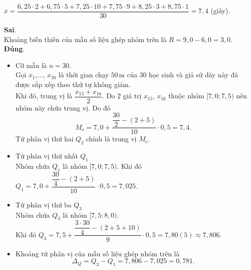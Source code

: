 \begin{ex}
{\begin{itemchoice}
			\begin{center}
				$\overline{x}=\dfrac{6{,}25 \cdot 2+6{,}75 \cdot 5+7{,}25 \cdot 10+7{,}75 \cdot 9+8{,}25 \cdot 3+8{,}75 \cdot 1}{30}=7{,}4$ (giây).
			\end{center}
			\itemch \textbf{Sai}.\\
			Khoảng biến thiên của mẫu số liệu ghép nhóm trên là $R=9{,}0-6{,}0=3{,}0$.
			\itemch \textbf{Đúng}.
			\begin{itemize}
				\item Cỡ mẫu là $n=30$.\\
				Gọi $x_{1}$,$\ldots$, $x_{30}$ là thời gian chạy $50$\,m của $30$ học sinh và giả sử dãy này đã được sắp xếp theo thứ tự không giảm.\\
				Khi đó, trung vị là $\dfrac{x_{15}+x_{16}}{2}$. Do $2$ giá trị $x_{15}$, $x_{16}$ thuộc nhóm $[7{,}0;7{,}5)$ nên nhóm này chứa trung vị. Do đó
				\[
				M_{\text{e}}=7{,}0+\dfrac{\dfrac{30}{2}-(2+5)}{10} \cdot 0{,}5=7{,}4.
				\]
				Tứ phân vị thứ hai $Q_{2}$ chính là trung vị $M_{\text{e}}$.
				\item Tứ phân vị thứ nhất $Q_{1}$\\
				Nhóm chứa $Q_{1}$ là nhóm $[7{,}0;7{,}5)$. Khi đó $Q_{1}=7{,}0+\dfrac{\dfrac{30}{4}-(2+5)}{10} \cdot 0{,}5=7{,}025$.
				\item Tứ phân vị thứ ba $Q_{3}$\\
				Nhóm chứa $Q_{3}$ là nhóm $[7{,}5;8{,}0)$.\\
				Khi đó $Q_{3}=7{,}5+\dfrac{\dfrac{3\cdot30}{4}-(2+5+10)}{9} \cdot 0{,}5=7{,}80(5) \approx 7{,}806$.
				\item Khoảng tứ phân vị của mẫu số liệu ghép nhóm trên là  \[\Delta_{Q}=Q_{3}-Q_{1}=7{,}806-7{,}025=0{,}781.\]
			\end{itemize}
		\end{itemchoice}
	}
\end{ex}

